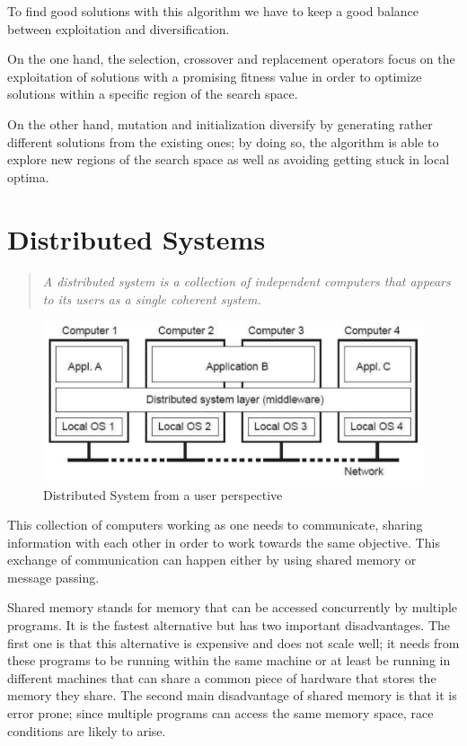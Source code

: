 To find good solutions with this algorithm we have to keep a good balance between exploitation and diversification. 

On the one hand, the selection, crossover and replacement operators focus on the exploitation of solutions with a promising fitness value in order to optimize solutions within a specific region of the search space. 

On the other hand, mutation and initialization diversify by generating rather different solutions from the existing ones; by doing so, the algorithm is able to explore new regions of the search space as well as avoiding getting stuck in local optima.

\section{Distributed Systems}
\begin{quotation}
\textit{A distributed system is a collection of independent computers that appears to its users as a single coherent system.}
\end{quotation}

\begin{figure}[h!]
\centering
    \includegraphics[scale=0.3]{assets/images/distributed-system_diagram.png}
    \caption{Distributed System from a user perspective}
    \label{fig:distributed_system}
\end{figure}

This collection of computers working as one needs to communicate, sharing information with each other in order to work towards the same objective. This exchange of communication can happen either by using shared memory or message passing.

Shared memory stands for memory that can be accessed concurrently by multiple programs. It is the fastest alternative but has two important disadvantages. The first one is that this alternative is expensive and does not scale well; it needs from these programs to be running within the same machine or at least be running in different machines that can share a common piece of hardware that stores the memory they share. The second main disadvantage of shared memory is that it is error prone; since multiple programs can access the same memory space, race conditions are likely to arise.

